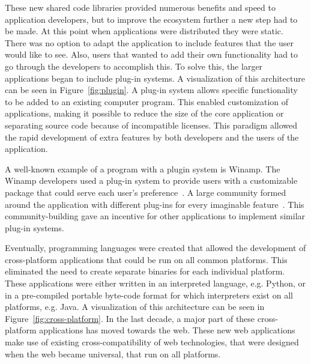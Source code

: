 These new shared code libraries provided numerous benefits and speed to application developers, but to improve the ecosystem further a new step had to be made. At this point when applications were distributed they were static. There was no option to adapt the application to include features that the user would like to see. Also, users that wanted to add their own functionality had to go through the developers to accomplish this. To solve this, the larger applications began to include plug-in systems. A visualization of this architecture can be seen in Figure~\ref{fig:plugin}. A plug-in system allows specific functionality to be added to an existing computer program. This enabled customization of applications, making it possible to reduce the size of the core application or separating source code because of incompatible licenses. This paradigm allowed the rapid development of extra features by both developers and the users of the application.

A well-known example of a program with a plugin system is Winamp. The Winamp developers used a plug-in system to provide users with a customizable package that could serve each user's preference~\cite{nullsoft1999winamp}. A large community formed around the application with different plug-ins for every imaginable feature~\cite{winampcommunity}. This community-building gave an incentive for other applications to implement similar plug-in systems.

Eventually, programming languages were created that allowed the development of cross-platform applications that could be run on all common platforms. This eliminated the need to create separate binaries for each individual platform. These applications were either written in an interpreted language, e.g. Python, or in a pre-compiled portable byte-code format for which interpreters exist on all platforms, e.g. Java. A visualization of this architecture can be seen in Figure~\ref{fig:cross-platform}. In the last decade, a major part of these cross-platform applications has moved towards the web. These new web applications make use of existing cross-compatibility of web technologies, that were designed when the web became universal, that run on all platforms.

